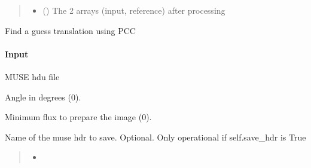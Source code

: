 \documentclass[letterpaper,10pt,english]{sphinxmanual}
\begin{document}
\begin{fulllineitems}
\begin{fulllineitems}
\begin{quote}
\begin{description}
\begin{itemize}
\item {} 
\sphinxAtStartPar
{} () \textendash{} The 2 arrays (input, reference) after processing

\end{itemize}

\end{description}\end{quote}

\end{fulllineitems}


\begin{fulllineitems}
\label{\detokenize{api/pymusepipe:pymusepipe.align_pipe.AlignMuseDataset.get_shift_from_pcc}}
\pysigstartsignatures
{}
\pysigstopsignatures
\sphinxAtStartPar
Find a guess translation using PCC


\paragraph{Input}
\label{\detokenize{api/pymusepipe:id8}}\begin{description}
\sphinxAtStartPar
MUSE hdu file

\sphinxAtStartPar
Angle in degrees (0).

\sphinxAtStartPar
Minimum flux to prepare the image (0).

\sphinxAtStartPar
Name of the muse hdr to save. Optional. Only operational if self.save\_hdr is True

\end{description}
\begin{quote}\begin{description}
\begin{itemize}
\item {} 
\sphinxAtStartPar
{}


\end{itemize}
\end{description}
\end{quote}
\end{fulllineitems}
\end{fulllineitems}
\end{document}
